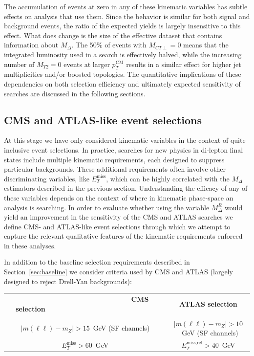 The accumulation of events at zero in any of these kinematic variables has subtle effects on analysis that use them. Since the behavior is similar for both signal and background events, the ratio of the expected yields is largely insensitive to this effect. What does change is the size of the effective dataset that contains information about $M_{\Delta}$. The 50\% of events with $M_{CT\perp} = 0$ means that the integrated luminosity used in a search is effectively halved, while the increasing number of $M_{T2} = 0$ events at larger $p_{T}^\text{CM}$ results in a similar effect for higher jet multiplicities and/or boosted topologies. The quantitative implications of these dependencies on both selection efficiency and ultimately expected sensitivity of searches are discussed in the following sections.

\subsection{CMS and ATLAS-like event selections\label{sec:CMSATLAS}}

At this stage we have only considered kinematic variables in the context of quite inclusive event selections. In practice, searches for new physics in di-lepton final states include multiple kinematic requirements, each designed to suppress particular backgrounds. These additional requirements often involve other discriminating variables, like $E_{T}^\text{miss}$, which can be highly correlated with the $M_{\Delta}$ estimators described in the previous section. Understanding the efficacy of any of these variables depends on the context of where in kinematic phase-space an analysis is searching. In order to evaluate whether using the variable $M_{\Delta}^{R}$ would yield an improvement in the sensitivity of the CMS and ATLAS searches we define CMS- and ATLAS-like event selections through which we attempt to capture the relevant qualitative features of the kinematic requirements enforced in these analyses. 

In addition to the baseline selection requirements described in Section~\ref{sec:baseline} we consider criteria used by CMS and ATLAS (largely designed to reject Drell-Yan backgrounds):\\
\begin{tabular}{c c}
~~~~~~~~~~~~~~~~~~~~~~~~~~~~~~~~{\bf CMS selection}~~~~~~~~~~~~~~~~~~~~~~~~~~~~~~~~ & {\bf ATLAS selection} \\
& \\
$|m(\ell\ell) - m_{Z}| > 15$~GeV (SF channels) & $|m(\ell\ell) - m_{Z}| > 10$~GeV (SF channels) \\
$E_{T}^\text{miss} > 60$~GeV & $E_{T}^\text{miss,rel} > 40$~GeV
\end{tabular}

